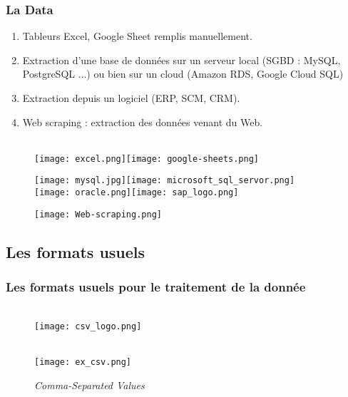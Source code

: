 \documentclass{beamer}
\theoremstyle{definition}
\begin{document}
\begin{frame}
	\frametitle{La Data}

\begin{minipage}[t]{1\linewidth}
		\begin{minipage}[t]{0.5\linewidth}
			\begin{enumerate}[$ $]
			\item Tableurs Excel, Google Sheet remplis manuellement.\\[0.3cm]
			\item Extraction d'une base de données sur un serveur local (SGBD : MySQL, PostgreSQL ...) ou bien sur un cloud (Amazon RDS, Google Cloud SQL) \\[0.3cm]
			\item Extraction depuis un logiciel (ERP, SCM, CRM).\\[0.3cm]
			\item  Web scraping : extraction des données venant du Web.
		\end{enumerate}	
	\end{minipage}\hfill
	\begin{minipage}[t]{0.45\linewidth}
		\begin{figure}
			\raggedright
			\hfill\\[-0.5cm]
			\texttt{[image: excel.png]}\quad \quad \texttt{[image: google-sheets.png]}
						
			\texttt{[image: mysql.jpg]}\quad \texttt{[image: microsoft\_sql\_servor.png]}\\[0.5cm]
			\texttt{[image: oracle.png]}\quad \texttt{[image: sap\_logo.png]}
			
			\texttt{[image: Web-scraping.png]}
			
		\end{figure}
	\end{minipage}
\end{minipage}
\end{frame}

\subsection{Les formats usuels}
\begin{frame}
	\frametitle{Les formats usuels pour le traitement de la donnée}
	\begin{minipage}[t]{1\linewidth}
	\begin{figure}
	\hfill\\[-0.5cm]
	\texttt{[image: csv\_logo.png]}
	\caption*{\emph{Comma-Separated Values}}
	\hfill\\[-0.5cm]
	\texttt{[image: ex\_csv.png]}
	\end{figure}
	\end{minipage}
\end{frame}
\end{document}
